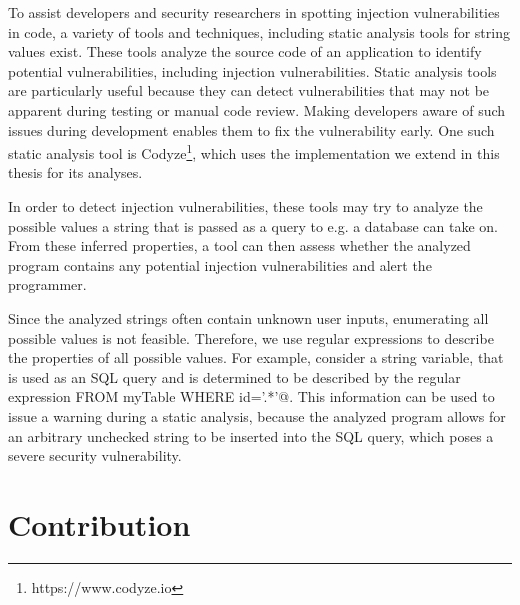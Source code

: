 To assist developers and security researchers in spotting injection vulnerabilities in code, a variety of tools and techniques, including static analysis tools for string values exist. These tools analyze the source code of an application to identify potential vulnerabilities, including injection vulnerabilities. Static analysis tools are particularly useful because they can detect vulnerabilities that may not be apparent during testing or manual code review. Making developers aware of such issues during development enables them to fix the vulnerability early. One such static analysis tool is Codyze\footnote{https://www.codyze.io}, which uses the implementation we extend in this thesis for its analyses.

In order to detect injection vulnerabilities, these tools may try to analyze the possible values a string that is passed as a query to e.g. a database can take on.
From these inferred properties, a tool can then assess whether the analyzed program contains any potential injection vulnerabilities and alert the programmer.

Since the analyzed strings often contain unknown user inputs, enumerating all possible values is not feasible. 
Therefore, we use regular expressions to describe the properties of all possible values.
For example, consider a string variable, that is used as an SQL query and is determined to be described by the regular expression \Verb@DELETE \* FROM myTable WHERE id='.*'@.
This information can be used to issue a warning during a static analysis, because the analyzed program allows for an arbitrary unchecked string to be inserted into the SQL query, which poses a severe security vulnerability.

\section{Contribution}\label{sec:intro:contribution}

